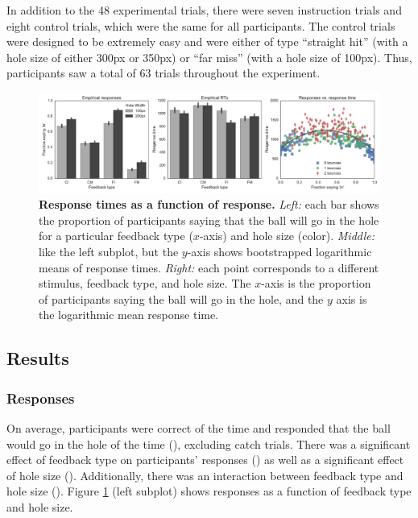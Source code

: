 \documentclass[10pt,letterpaper]{article}
\begin{document}
In addition to the 48 experimental trials, there were seven instruction trials and eight control trials, which were the same for all participants. The control trials were designed to be extremely easy and were either of type ``straight hit'' (with a hole size of either 300px or 350px) or ``far miss'' (with a hole size of 100px). Thus, participants saw a total of 63 trials throughout the experiment.

\begin{figure}[t]
    \begin{center}
        \includegraphics[width=\textwidth]{figures/hole_empirical_results.pdf}
        \caption{\textbf{Response times as a function of response.} \emph{Left:} each bar shows the proportion of participants saying that the ball will go in the hole for a particular feedback type ($x$-axis) and hole size (color). \emph{Middle:} like the left subplot, but the $y$-axis shows bootstrapped logarithmic means of response times. \emph{Right:} each point corresponds to a different stimulus, feedback type, and hole size.  The $x$-axis is the proportion of participants saying the ball will go in the hole, and the $y$ axis is the logarithmic mean response time.}
        \label{fig:pct-vs-rt}
    \end{center}
\end{figure}

\subsection{Results}

\subsubsection{Responses}

On average, participants were correct \AvgCorrect{} of the time and responded that the ball would go in the hole \AvgResponse{} of the time (\ResponseN{}), excluding catch trials. There was a significant effect of feedback type on participants' responses (\ResponseHoleClass{}) as well as a significant effect of hole size (\ResponseHoleSize{}). Additionally, there was an interaction between feedback type and hole size (\ResponseFull{}). Figure \ref{fig:pct-vs-rt} (left subplot) shows responses as a function of feedback type and hole size.
\end{document}
